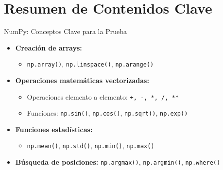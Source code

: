 \documentclass[10pt]{beamer}
\begin{document}
\section{Resumen de Contenidos Clave}

\begin{frame}{NumPy: Conceptos Clave para la Prueba}
  \begin{itemize}
    \item \textbf{Creación de arrays:}
      \begin{itemize}
        \item \texttt{np.array()}, \texttt{np.linspace()}, \texttt{np.arange()}
      \end{itemize}
    \item \textbf{Operaciones matemáticas vectorizadas:}
      \begin{itemize}
        \item Operaciones elemento a elemento: \texttt{+, -, *, /, **}
        \item Funciones: \texttt{np.sin()}, \texttt{np.cos()}, \texttt{np.sqrt()}, \texttt{np.exp()}
      \end{itemize}
    \item \textbf{Funciones estadísticas:}
      \begin{itemize}
        \item \texttt{np.mean()}, \texttt{np.std()}, \texttt{np.min()}, \texttt{np.max()}
      \end{itemize}
    \item \textbf{Búsqueda de posiciones:} \texttt{np.argmax()}, \texttt{np.argmin()}, \texttt{np.where()}
  \end{itemize}
\end{frame}
\end{document}
